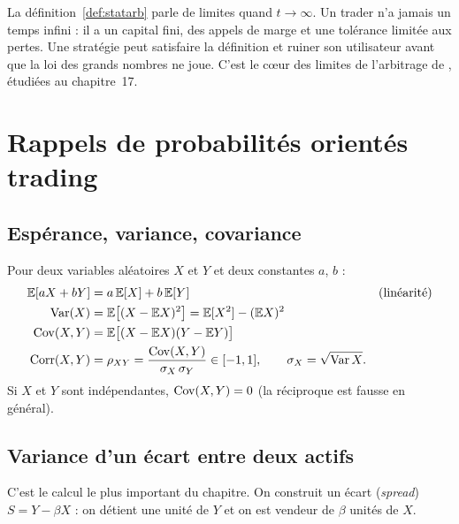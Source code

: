 \documentclass[11pt,a4paper]{article}
\begin{document}
\begin{pitfall}
La définition~\ref{def:statarb} parle de limites quand $t\to\infty$. Un trader n'a jamais un temps infini : il a un capital fini, des appels de marge et une tolérance limitée aux pertes. Une stratégie peut satisfaire la définition et ruiner son utilisateur avant que la \og loi des grands nombres\fg{} ne joue. C'est le cœur des \og limites de l'arbitrage\fg{} de \citet{shleifer1997}, étudiées au chapitre~17.
\end{pitfall}

\section{Rappels de probabilités orientés trading}

\subsection{Espérance, variance, covariance}

Pour deux variables aléatoires $X$ et $Y$ et deux constantes $a$, $b$ :
\begin{align}
\mathbb{E}[aX + bY] &= a\,\mathbb{E}[X] + b\,\mathbb{E}[Y] && \text{(linéarité)}\label{eq:lin}\\
\operatorname{Var}(X) &= \mathbb{E}\big[(X-\mathbb{E} X)^2\big] = \mathbb{E}[X^2] - (\mathbb{E} X)^2 \label{eq:var}\\
\operatorname{Cov}(X,Y) &= \mathbb{E}\big[(X-\mathbb{E} X)(Y-\mathbb{E} Y)\big] \label{eq:cov}\\
\operatorname{Corr}(X,Y) &= \rho_{XY} = \frac{\operatorname{Cov}(X,Y)}{\sigma_X\,\sigma_Y} \in [-1,1], \qquad \sigma_X = \sqrt{\operatorname{Var} X}. \label{eq:corr}
\end{align}
Si $X$ et $Y$ sont indépendantes, $\operatorname{Cov}(X,Y)=0$ (la réciproque est fausse en général).

\subsection{Variance d'un écart entre deux actifs}

C'est le calcul le plus important du chapitre. On construit un écart (\emph{spread}) $S = Y - \beta X$ : on détient une unité de $Y$ et on est vendeur de $\beta$ unités de $X$.
\end{document}
